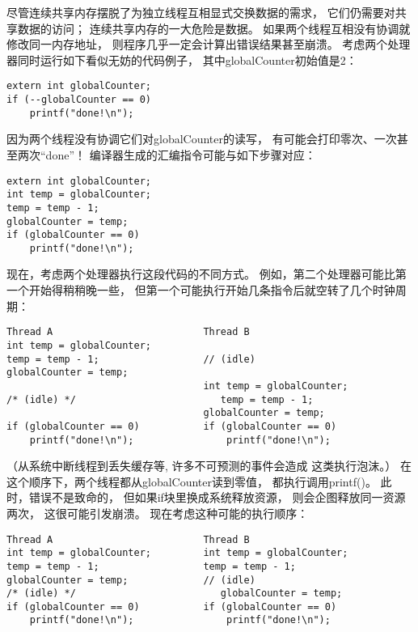 尽管连续共享内存摆脱了为独立线程互相显式交换数据的需求，
它们仍需要对共享数据的访问；
连续共享内存的一大危险是数据。
如果两个线程互相没有协调就修改同一内存地址，
则程序几乎一定会计算出错误结果甚至崩溃。
考虑两个处理器同时运行如下看似无妨的代码例子，
其中{\ttfamily globalCounter}初始值是2：
\begin{lstlisting}
extern int globalCounter;
if (--globalCounter == 0)
    printf("done!\n");
\end{lstlisting}

因为两个线程没有协调它们对{\ttfamily globalCounter}的读写，
有可能会打印零次、一次甚至两次“done”！
编译器生成的汇编指令可能与如下步骤对应：
\begin{lstlisting}
extern int globalCounter;
int temp = globalCounter;
temp = temp - 1;
globalCounter = temp;
if (globalCounter == 0)
    printf("done!\n");
\end{lstlisting}

现在，考虑两个处理器执行这段代码的不同方式。
例如，第二个处理器可能比第一个开始得稍稍晚一些，
但第一个可能执行开始几条指令后就空转了几个时钟周期：
\begin{lstlisting}
Thread A                          Thread B
int temp = globalCounter;   
temp = temp - 1;                  // (idle)
globalCounter = temp;             
                                  int temp = globalCounter;
/* (idle) */                         temp = temp - 1;
                                  globalCounter = temp;
if (globalCounter == 0)           if (globalCounter == 0)
    printf("done!\n");                printf("done!\n");
\end{lstlisting}
（从系统中断线程到丢失缓存等,
许多不可预测的事件会造成
这类执行泡沫。）
在这个顺序下，两个线程都从{\ttfamily globalCounter}读到零值，
都执行调用{\ttfamily printf()}。
此时，错误不是致命的，
但如果{\ttfamily if}块里换成系统释放资源，
则会企图释放同一资源两次，
这很可能引发崩溃。
现在考虑这种可能的执行顺序：
\begin{lstlisting}
Thread A                          Thread B
int temp = globalCounter;         int temp = globalCounter;
temp = temp - 1;                  temp = temp - 1;
globalCounter = temp;             // (idle)
/* (idle) */                         globalCounter = temp;
if (globalCounter == 0)           if (globalCounter == 0)
    printf("done!\n");                printf("done!\n");
\end{lstlisting}

